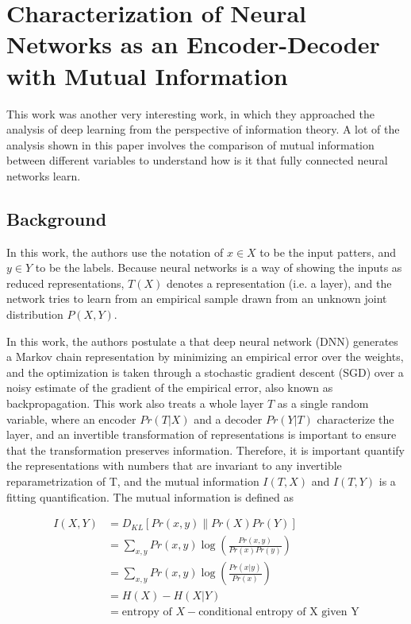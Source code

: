\section{Characterization of Neural Networks as an Encoder-Decoder with Mutual Information \cite{blackbox}}
This work was another very interesting work, in which they approached the analysis of deep learning from the perspective of information theory. A lot of the analysis shown in this paper involves the comparison of mutual information between different variables to understand how is it that fully connected neural networks learn.

\subsection{Background}
In this work, the authors use the notation of $x\in X$ to be the input patters, and $y\in Y$ to be the labels. Because neural networks is a way of showing the inputs as reduced representations, $T(X)$ denotes a representation (i.e. a layer), and the network tries to learn from an empirical sample drawn from an unknown joint distribution $P(X,Y)$.

In this work, the authors postulate a that deep neural network (DNN) generates a Markov chain representation by minimizing an empirical error over the weights, and the optimization is taken through a stochastic gradient descent (SGD) over a noisy estimate of the gradient of the empirical error, also known as backpropagation. This work also treats a whole layer $T$ as a single random variable, where an encoder $Pr(T|X)$ and a decoder $Pr(Y|T)$ characterize the layer, and an invertible transformation of representations is important to ensure that the transformation preserves information. Therefore, it is important quantify the representations with numbers that are invariant to any invertible reparametrization of T, and the mutual information $I(T,X)$ and $I(T,Y)$ is a fitting quantification. The mutual information is defined as

\begin{align*}
    I(X,Y) &= D_{KL} [Pr(x,y) \| Pr(X) Pr(Y)] \\
    &= \sum_{x,y} Pr(x,y) \log \left( \frac{Pr(x,y)}{Pr(x)Pr(y)} \right) \\
    &= \sum_{x,y} Pr(x,y) \log \left( \frac{Pr(x|y)}{Pr(x)} \right) \\
    &= H(X) - H(X|Y) \\
    &= \text{entropy of $X$} - \text{conditional entropy of X given Y}
\end{align*}

